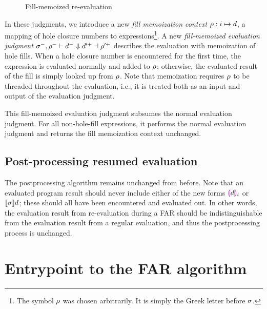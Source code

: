 \begin{figure}
  \centering
  \begin{mdframed}
    \begin{singlespace}
      
    \end{singlespace}
  \end{mdframed}
  \caption{Fill-memoized re-evaluation}
  \label{fig:fill-memoized-resume}
\end{figure}

In these judgments, we introduce a new \textit{fill memoization context} $\rho:i\mapsto d$, a mapping of hole closure numbers to expressions\footnote{The symbol $\rho$ was chosen arbitrarily. It is simply the Greek letter before $\sigma$.}. A new \textit{fill-memoized evaluation judgment} $\sigma^-,\rho^-\vdash d^-\Downarrow d'^+\dashv\rho'^+$ describes the evaluation with memoization of hole fills. When a hole closure number is encountered for the first time, the expression is evaluated normally and added to $\rho$; otherwise, the evaluated result of the fill is simply looked up from $\rho$. Note that memoization requires $\rho$ to be threaded throughout the evaluation, i.e., it is treated both as an input and output of the evaluation judgment.

This fill-memoized evaluation judgment subsumes the normal evaluation judgment. For all non-hole-fill expressions, it performs the normal evaluation judgment and returns the fill memoization context unchanged.

\subsection{Post-processing resumed evaluation}
\label{sec:far-postprocessing}

The postprocessing algorithm remains unchanged from before. Note that an evaluated program result should never include either of the new forms $\textcolor{violet}{\llparenthesis} d\textcolor{violet}{\rrparenthesis}_i$ or $\llbracket\sigma\rrbracket d$; these should all have been encountered and evaluated out. In other words, the evaluation result from re-evaluation during a FAR should be indistinguishable from the evaluation result from a regular evaluation, and thus the postprocessing process is unchanged.

\section{Entrypoint to the FAR algorithm}
\label{sec:far-entrypoint}

